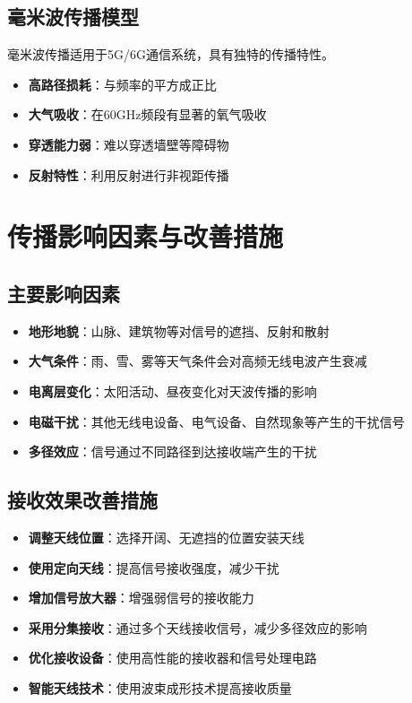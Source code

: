 \documentclass[12pt,UTF8]{ctexbook}
\begin{document}
\subsection{毫米波传播模型}
毫米波传播适用于5G/6G通信系统，具有独特的传播特性。
\begin{itemize}[leftmargin=3.5em]
    \item \textbf{高路径损耗}：与频率的平方成正比
    \item \textbf{大气吸收}：在60GHz频段有显著的氧气吸收
    \item \textbf{穿透能力弱}：难以穿透墙壁等障碍物
    \item \textbf{反射特性}：利用反射进行非视距传播
\end{itemize}

\section{传播影响因素与改善措施}

\subsection{主要影响因素}
\begin{itemize}[leftmargin=3.5em]
    \item \textbf{地形地貌}：山脉、建筑物等对信号的遮挡、反射和散射
    \item \textbf{大气条件}：雨、雪、雾等天气条件会对高频无线电波产生衰减
    \item \textbf{电离层变化}：太阳活动、昼夜变化对天波传播的影响
    \item \textbf{电磁干扰}：其他无线电设备、电气设备、自然现象等产生的干扰信号
    \item \textbf{多径效应}：信号通过不同路径到达接收端产生的干扰
\end{itemize}

\subsection{接收效果改善措施}
\begin{itemize}[leftmargin=3.5em]
    \item \textbf{调整天线位置}：选择开阔、无遮挡的位置安装天线
    \item \textbf{使用定向天线}：提高信号接收强度，减少干扰
    \item \textbf{增加信号放大器}：增强弱信号的接收能力
    \item \textbf{采用分集接收}：通过多个天线接收信号，减少多径效应的影响
    \item \textbf{优化接收设备}：使用高性能的接收器和信号处理电路
    \item \textbf{智能天线技术}：使用波束成形技术提高接收质量
\end{itemize}
\end{document}
